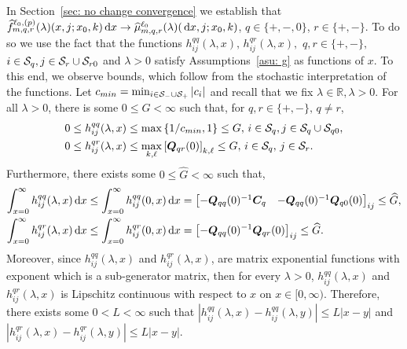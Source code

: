 In Section~\ref{sec: no change convergence} we establish that \(\widehat f_{m,q,r}^{\ell_0,(p)}(\lambda)(x,j;x_0,k)\, \mathrm{d} x\to\widehat \mu_{m,q,r}^{\ell_0}(\lambda)(\, \mathrm{d} x,j;x_0,k)\), \(q\in\{+,-,0\}\), \(r\in\{+,-\}\). To do so we use the fact that the functions \(h_{ij}^{qq}(\lambda,x),\,h_{ij}^{qr}(\lambda,x),\) \(q,r\in\{+,-\},\) \(i\in\mathcal{S}_q,j\in\mathcal S_r\cup\mathcal{S}_{r0}\) and \(\lambda>0\) satisfy Assumptions~\ref{asu: g} as functions of \(x\). To this end, we observe bounds, which follow from the stochastic interpretation of the functions. Let \(c_{min}=\min_{i\in\mathcal S_-\cup\mathcal{S}_+} |c_i|\) and recall that we fix \(\lambda\in\mathbb R, \lambda >0\). For all \(\lambda > 0\), there is some \(0\leq G<\infty\) such that, for \(q,r\in\{+,-\},\, q\neq r\),  
\begin{align*}
	0\leq h_{ij}^{qq}(\lambda,x) &\leq   \max\left\{1/c_{min},1\right\}\leq G,\, i\in\mathcal S_q,j\in\mathcal{S}_q\cup\mathcal S_{q0},
	\\0\leq  h_{ij}^{qr}(\lambda,x)  &  \leq \max_{k,\ell}\left[\boldsymbol{Q}_{qr}(0)\right]_{k,\ell}\leq G, \, i\in\mathcal S_q,\, j\in\mathcal S_r.
\end{align*}
Furthermore, there exists some \(0\leq \widehat G<\infty\) such that, 
\begin{align*}
	\int_{x=0}^\infty  h_{ij}^{qq}(\lambda,x) \, \mathrm{d} x &\leq \int_{x=0}^\infty  h_{ij}^{qq}(0,x) \, \mathrm{d} x = \begin{bmatrix} -\boldsymbol{Q}_{qq}(0)^{-1}\boldsymbol{C}_q & -\boldsymbol Q_{qq}(0)^{-1}\boldsymbol Q_{q0}(0) \end{bmatrix}_{ij}\leq \widehat G, 
	\\\int_{x=0}^\infty  h_{ij}^{qr}(\lambda,x) \, \mathrm{d} x &\leq \int_{x=0}^\infty  h_{ij}^{qr}(0,x) \, \mathrm{d} x = \left[-\boldsymbol{Q}_{qq}(0)^{-1}\boldsymbol{Q}_{qr}(0)\right]_{ij}\leq \widehat G.
\end{align*}
Moreover, since \(h_{ij}^{qq}(\lambda,x)\) and \(h_{ij}^{qr}(\lambda,x)\), are matrix exponential functions with exponent which is a sub-generator matrix, then for every \(\lambda >0\), \(h_{ij}^{qq}(\lambda,x)\) and \(h_{ij}^{qr}(\lambda,x)\) is Lipschitz continuous with respect to \(x\) on \(x\in[0,\infty)\). Therefore, there exists some \(0<L<\infty\) such that \(\left|h_{ij}^{qq}(\lambda,x)-h_{ij}^{qq}(\lambda,y)\right|\leq L|x-y|\) and \(\left|h_{ij}^{qr}(\lambda,x)-h_{ij}^{qr}(\lambda,y)\right|\leq L|x-y|.\)

